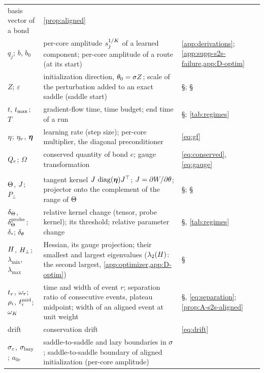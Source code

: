\begin{xltabular}{\textwidth}{@{}>{\raggedright\arraybackslash}p{3.1cm}X
    >{\raggedright\arraybackslash}p{2.5cm}@{}}
    basis vector of a bond & \cref{prop:aligned} \\
  $q_j$; $b$, $b_0$ & per-core amplitude $s_{j}^{1/K}$ of a learned component; per-core amplitude of a
    route (at its start) & \cref{app:derivations}; \cref{app:supp-s2s-failure,app:D-optim} \\
  $Z$; $\varepsilon$ & initialization direction, $\theta_0=\sigma Z$; scale of the perturbation added to an
    exact saddle (saddle start) & \S{}; \S{} \\
  $t$, $t_{\max}$; $T$ & gradient-flow time, time budget; end time of a run
    & \S{}; \cref{tab:regimes} \\
  $\eta$; $\eta_{v}$, $\boldsymbol{\eta}$ & learning rate (step size); per-core multiplier, the diagonal
    preconditioner & \eqref{eq:gf} \\
  $Q_{e}$; $\Omega$ & conserved quantity of bond $e$; gauge transformation & \eqref{eq:conserved},
    \eqref{eq:gauge} \\
  \midrule
   \\
  $\Theta$, $J$; $P_\perp$ & tangent kernel $J\,\operatorname{diag}(\boldsymbol{\eta})J^{\top}$; $J=\partial W/\partial\theta$;
    projector onto the complement of the range of $\Theta$ & \S{};
    \S{} \\
  $\delta_{\Theta}$, $\delta_{\Theta}^{\rm probe}$; $\delta_*$; $\delta_{\theta}$ & relative kernel change (tensor, probe kernel); its
    threshold; relative parameter change & \S{}, \cref{tab:regimes} \\
  $H$, $H_{\perp}$; $\lambda_{\min}$, $\lambda_{\max}$ & Hessian, its gauge projection; their smallest and
    largest eigenvalues ($\lambda_2(H)$: the second largest, \cref{app:optimizer,app:D-optim})
    & \S{} \\
  $t_{r}$, $\omega_{r}$; $\rho_{i}$, $t^{\mathrm{mid}}_{i}$; $\omega_K$ & time and width of event $r$; separation ratio of
    consecutive events, plateau midpoint; width of an aligned event at unit weight
    & \S{}, \eqref{eq:separation}; \cref{prop:A-s2s-aligned} \\
  drift & conservation drift & \eqref{eq:drift} \\
  $\sigma_c$, $\sigma_{\rm lazy}$; $a_{0c}$ & saddle-to-saddle and lazy boundaries in $\sigma$;
    saddle-to-saddle boundary of aligned initialization (per-core amplitude)

\end{xltabular}
